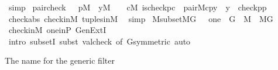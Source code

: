 \begin{isabellebody}
\ simp\isanewline
{}\isamarkupfalse%
%
\endisatagproof
{\isafoldproof}%
%
\isadelimproof
\isanewline
%
\endisadelimproof
\isanewline
{}\isamarkupfalse%
\ pair{\isacharunderscore}{\kern0pt}check\ {\isacharcolon}{\kern0pt}\ {\isachardoublequoteopen}{\isasymlbrakk}\ p{\isasymin}M\ {\isacharsemicolon}{\kern0pt}\ y{\isasymin}M\ {\isasymrbrakk}\ \ {\isasymLongrightarrow}\ {\isacharparenleft}{\kern0pt}{\isasymexists}c{\isasymin}M{\isachardot}{\kern0pt}\ is{\isacharunderscore}{\kern0pt}check{\isacharparenleft}{\kern0pt}p{\isacharcomma}{\kern0pt}c{\isacharparenright}{\kern0pt}\ {\isasymand}\ pair{\isacharparenleft}{\kern0pt}{\isacharhash}{\kern0pt}{\isacharhash}{\kern0pt}M{\isacharcomma}{\kern0pt}c{\isacharcomma}{\kern0pt}p{\isacharcomma}{\kern0pt}y{\isacharparenright}{\kern0pt}{\isacharparenright}{\kern0pt}\ {\isasymlongleftrightarrow}\ y\ {\isacharequal}{\kern0pt}\ {\isasymlangle}check{\isacharparenleft}{\kern0pt}p{\isacharparenright}{\kern0pt}{\isacharcomma}{\kern0pt}p{\isasymrangle}{\isachardoublequoteclose}\isanewline
%
\isadelimproof
\ \ %
\endisadelimproof
%
\isatagproof
{}\isamarkupfalse%
\ check{\isacharunderscore}{\kern0pt}abs\ check{\isacharunderscore}{\kern0pt}in{\isacharunderscore}{\kern0pt}M\ tuples{\isacharunderscore}{\kern0pt}in{\isacharunderscore}{\kern0pt}M\ \isamarkupfalse%
\ simp%
\endisatagproof
{\isafoldproof}%
%
\isadelimproof
\isanewline
%
\endisadelimproof
\isanewline
\isanewline
{}\isamarkupfalse%
\ M{\isacharunderscore}{\kern0pt}subset{\isacharunderscore}{\kern0pt}MG\ {\isacharcolon}{\kern0pt}\ \ {\isachardoublequoteopen}one\ {\isasymin}\ G\ {\isasymLongrightarrow}\ M\ {\isasymsubseteq}\ M{\isacharbrackleft}{\kern0pt}G{\isacharbrackright}{\kern0pt}{\isachardoublequoteclose}\isanewline
%
\isadelimproof
\ \ %
\endisadelimproof
%
\isatagproof
{}\isamarkupfalse%
\ check{\isacharunderscore}{\kern0pt}in{\isacharunderscore}{\kern0pt}M\ one{\isacharunderscore}{\kern0pt}in{\isacharunderscore}{\kern0pt}P\ GenExtI\isanewline
\ \ \isamarkupfalse%
\ {\isacharparenleft}{\kern0pt}intro\ subsetI{\isacharcomma}{\kern0pt}\ subst\ valcheck\ {\isacharbrackleft}{\kern0pt}of\ G{\isacharcomma}{\kern0pt}symmetric{\isacharbrackright}{\kern0pt}{\isacharcomma}{\kern0pt}\ auto{\isacharparenright}{\kern0pt}%
\endisatagproof
{\isafoldproof}%
%
\isadelimproof
%
\endisadelimproof
%
\begin{isamarkuptext}%
The name for the generic filter%
\end{isamarkuptext}\isamarkuptrue%
\isamarkupfalse%

\end{isabellebody}
